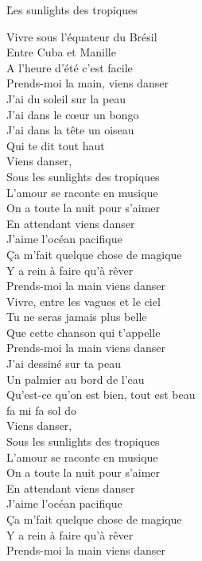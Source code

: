 \documentclass{novel}
\begin{document}
\newpage
\normalsize
\h*{Les sunlights des tropiques}
\begin{multicols}{2}
Vivre sous l'équateur du Brésil \\
Entre Cuba et Manille \\
A l'heure d'été c'est facile \\
Prends-moi la main, viens danser \\
J'ai du soleil sur la peau \\
J'ai dans le cœur un bongo \\
J'ai dans la tête un oiseau \\
Qui te dit tout haut \\

Viens danser, \\
Sous les sunlights des tropiques \\
L'amour se raconte en musique \\
On a toute la nuit pour s'aimer \\
En attendant viens danser \\
J'aime l'océan pacifique \\
Ça m'fait quelque chose de magique \\
Y a rein à  faire qu'à  rêver \\
Prends-moi la main viens danser \\

Vivre, entre les vagues et le ciel \\
Tu ne seras jamais plus belle \\
Que cette chanson qui t'appelle \\
Prends-moi la main viens danser \\
J'ai dessiné sur ta peau \\
Un palmier au bord de l'eau \\
Qu'est-ce qu'on est bien, tout est beau \\
fa mi fa sol do \\

Viens danser, \\
Sous les sunlights des tropiques \\
L'amour se raconte en musique \\
On a toute la nuit pour s'aimer \\
En attendant viens danser \\
J'aime l'océan pacifique \\
Ça m'fait quelque chose de magique \\
Y a rein à  faire qu'à  rêver \\
Prends-moi la main viens danser \\


\end{multicols}
\end{document}

